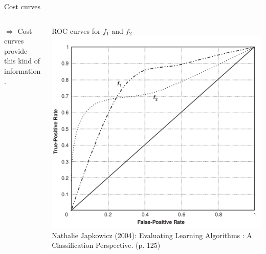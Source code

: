 \begin{vbframe}{Cost curves}
\begin{columns}
\begin{column}{0.6\textwidth}
  $\Rightarrow$ Cost curves provide this kind of information.
\end{column}
\begin{column}{0.39\textwidth}
    \centering
    \tiny ROC curves for $f_1$ and $f_2$
    \includegraphics[width=\textwidth]{figure_man/cost-curves-1.png}
    {\tiny Nathalie Japkowicz (2004): Evaluating Learning Algorithms : A
    Classification Perspective. (p. 125)}
\end{column}
\end{columns}


\end{vbframe}






